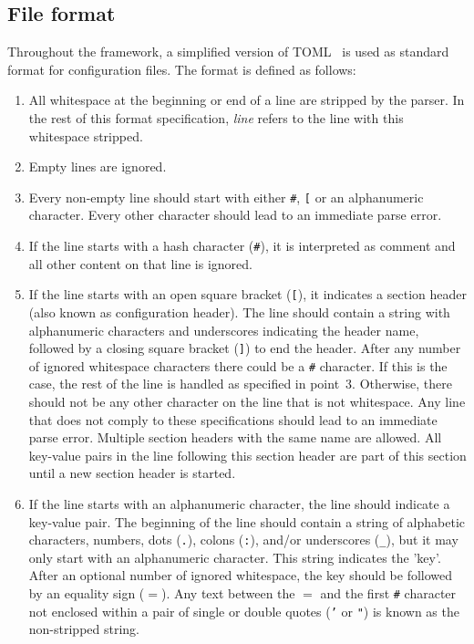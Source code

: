 \subsection{File format}
\label{sec:config_file_format}
Throughout the framework, a simplified version of TOML~\cite{tomlgit} is used as standard format for configuration files.
The format is defined as follows:
\begin{enumerate}
\item All whitespace at the beginning or end of a line are stripped by the parser.
In the rest of this format specification, \textit{line} refers to the line with this whitespace stripped.
\item Empty lines are ignored.
\item Every non-empty line should start with either \texttt{\#}, \texttt{[} or an alphanumeric character.
Every other character should lead to an immediate parse error.
\item If the line starts with a hash character (\texttt{\#}), it is interpreted as comment and all other content on that line is ignored.
\item If the line starts with an open square bracket (\texttt{[}), it indicates a section header (also known as configuration header).
The line should contain a string with alphanumeric characters and underscores indicating the header name, followed by a closing square bracket (\texttt{]}) to end the header.
After any number of ignored whitespace characters there could be a \texttt{\#} character.
If this is the case, the rest of the line is handled as specified in point~3.
Otherwise, there should not be any other character on the line that is not whitespace.
Any line that does not comply to these specifications should lead to an immediate parse error.
Multiple section headers with the same name are allowed.
All key-value pairs in the line following this section header are part of this section until a new section header is started.
\item If the line starts with an alphanumeric character, the line should indicate a key-value pair.
The beginning of the line should contain a string of alphabetic characters, numbers, dots (\texttt{.}), colons (\texttt{:}), and/or underscores (\texttt{\_}), but it may only start with an alphanumeric character.
This string indicates the 'key'.
After an optional number of ignored whitespace, the key should be followed by an equality sign (\texttt{$=$}).
Any text between the \texttt{$=$} and the first \texttt{\#} character not enclosed within a pair of single or double quotes (\texttt{'} or \texttt{"}) is known as the non-stripped string.

\end{enumerate}
